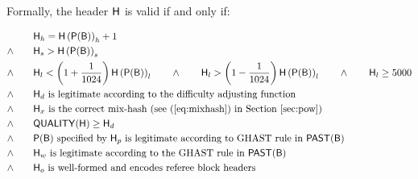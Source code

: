 \medskip

Formally, the header $\textsf{H}$ is valid if and only if: 


\begin{align}
	&{\textsf{H}_h} = \textsf{H}\left(\mathsf{P}(\textsf{B})\right)_{h}+1\\
	\land \qquad &{\textsf{H}_s} > \textsf{H}\left(\mathsf{P}(\textsf{B})\right)_{s}\\
	\land \qquad &{\textsf{H}_l} < \left(1+\frac{1}{1024}\right)\textsf{H}\left(\mathsf{P}(\textsf{B})\right)_{l} \qquad
	\land \qquad {\textsf{H}_l}> \left(1-\frac{1}{1024}\right) \textsf{H}\left(\mathsf{P}(\textsf{B})\right)_{l} \qquad
	\land \qquad {\textsf{H}_l}\ge 5000 \label{eq:blockgas}\\
	\land \qquad & \text{${\textsf{H}_d}$ is legitimate according to the difficulty adjusting function}\\
	\land \qquad & \text{${\textsf{H}_x}$ is the correct mix-hash (see (\ref{eq:mixhash}) in Section~\ref{sec:pow})}\\
	\land \qquad & \mathsf{QUALITY}(\textsf{H}) \ge {\textsf{H}_d}\\
	\land \qquad & {\text{$\mathsf{P}(\textsf{B})$ specified by ${\textsf{H}_p}$ is legitimate according to GHAST rule in $\mathsf{PAST}(\textsf{B})$}}\\
	\land \qquad & {\text{${\textsf{H}_w}$ is legitimate according to the GHAST rule in $\mathsf{PAST}(\textsf{B})$}}\\
	\land \qquad & {\text{${\textsf{H}_o}$ is well-formed and encodes referee block headers}}
\end{align}



